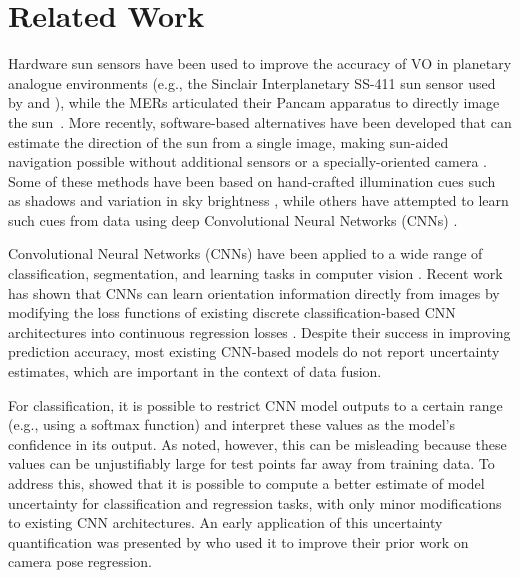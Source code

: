 \section{Related Work}


Hardware sun sensors have been used to improve the accuracy of VO in planetary analogue environments (e.g., the Sinclair Interplanetary SS-411 sun sensor used by \citet{Furgale2011-zu} and \citet{Lambert2012-sn}), while the MERs articulated their Pancam apparatus to directly image the sun~\citep{Maimone2007-tc,Eisenman2002-cg}. 
More recently, software-based alternatives have been developed that can estimate the direction of the sun from a single image, making sun-aided navigation possible without additional sensors or a specially-oriented camera \citep{2017_Clement_Improving}. 
Some of these methods have been based on hand-crafted illumination cues such as shadows and variation in sky brightness \citep{Lalonde2011-jw,2017_Clement_Improving}, while others have attempted to learn such cues from data using deep Convolutional Neural Networks (CNNs) \citep{Ma2016-at}.

Convolutional Neural Networks (CNNs) have been applied to a wide range of classification, segmentation, and learning tasks in computer vision \citep{LeCun2015-qf}. 
Recent work has shown that CNNs can learn orientation information directly from images by modifying the loss functions of existing discrete classification-based CNN architectures into continuous regression losses \citep{Ma2016-at, Kendall2015-ew, Kendall2016-zf}. 
Despite their success in improving prediction accuracy, most existing CNN-based models do not report uncertainty estimates, which are important in the context of data fusion.

For classification, it is possible to restrict CNN model outputs to a certain range (e.g., using a softmax function) and interpret these values as the model's confidence in its output. As \citet{Gal2016UncertaintyThesis} noted, however, this can be misleading because these  values can be unjustifiably large for test points far away from training data.  To address this, \citet{Gal2016-ny} showed that it is possible to compute a better estimate of model uncertainty for classification and regression tasks, with only minor modifications to existing CNN architectures. 
An early application of this uncertainty quantification was presented by \citet{Kendall2016-zf} who used it to improve their prior work \citep{Kendall2015-ew} on camera pose regression.

